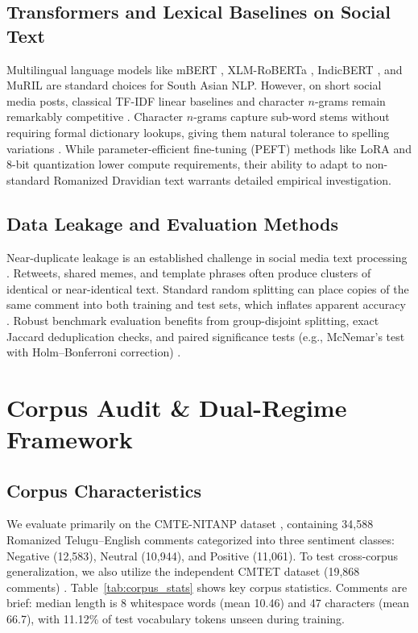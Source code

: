 \documentclass[10pt,conference]{IEEEtran}
\begin{document}
\subsection{Transformers and Lexical Baselines on Social Text}
Multilingual language models like mBERT \cite{devlin2019}, XLM-RoBERTa \cite{conneau2020}, IndicBERT \cite{kakwani2020}, and MuRIL \cite{khan2021} are standard choices for South Asian NLP. However, on short social media posts, classical TF-IDF linear baselines and character $n$-grams remain remarkably competitive \cite{salton1988, cavnar1994}. Character $n$-grams capture sub-word stems without requiring formal dictionary lookups, giving them natural tolerance to spelling variations \cite{manning2008}. While parameter-efficient fine-tuning (PEFT) methods like LoRA \cite{hu2022} and 8-bit quantization \cite{dettmers2023} lower compute requirements, their ability to adapt to non-standard Romanized Dravidian text warrants detailed empirical investigation.

\subsection{Data Leakage and Evaluation Methods}
Near-duplicate leakage is an established challenge in social media text processing \cite{kaufman2012}. Retweets, shared memes, and template phrases often produce clusters of identical or near-identical text. Standard random splitting can place copies of the same comment into both training and test sets, which inflates apparent accuracy \cite{kaufman2012}. Robust benchmark evaluation benefits from group-disjoint splitting, exact Jaccard deduplication checks, and paired significance tests (e.g., McNemar's test with Holm--Bonferroni correction) \cite{dietterich1998, holm1979}.

\section{Corpus Audit \& Dual-Regime Framework}
\subsection{Corpus Characteristics}
We evaluate primarily on the CMTE-NITANP dataset \cite{rayala2026}, containing 34{,}588 Romanized Telugu--English comments categorized into three sentiment classes: Negative (12{,}583), Neutral (10{,}944), and Positive (11{,}061). To test cross-corpus generalization, we also utilize the independent CMTET dataset (19{,}868 comments) \cite{kusampudi2021}. Table~\ref{tab:corpus_stats} shows key corpus statistics. Comments are brief: median length is 8 whitespace words (mean 10.46) and 47 characters (mean 66.7), with 11.12\% of test vocabulary tokens unseen during training.
\end{document}
